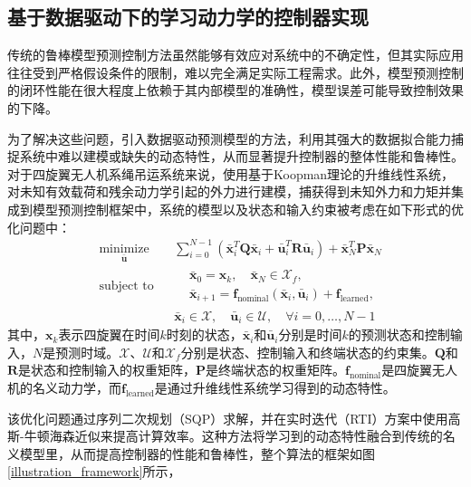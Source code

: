 \documentclass[lang=chs, degree=master, blindreview=false, winfonts=true]{yanputhesis}
\begin{document}
\subsection{基于数据驱动下的学习动力学的控制器实现}

传统的鲁棒模型预测控制方法虽然能够有效应对系统中的不确定性，但其实际应用往往受到严格假设条件的限制，难以完全满足实际工程需求。此外，模型预测控制的闭环性能在很大程度上依赖于其内部模型的准确性，模型误差可能导致控制效果的下降。

为了解决这些问题，引入数据驱动预测模型的方法，利用其强大的数据拟合能力捕捉系统中难以建模或缺失的动态特性，从而显著提升控制器的整体性能和鲁棒性。
对于四旋翼无人机系绳吊运系统来说，使用基于Koopman理论的升维线性系统，对未知有效载荷和残余动力学引起的外力进行建模，捕获得到未知外力和力矩并集成到模型预测控制框架中，系统的模型以及状态和输入约束被考虑在如下形式的优化问题中：
\begin{equation}
	\begin{aligned} \label{nmpc}
		&\operatorname*{minimize}_{\bm{\bar{u}}}& & \sum_{i=0}^{N-1}\left(\bm{\bar{x}}_i^T\bm{Q}\bm{\bar{x}}_i + \bm{\bar{u}}_i^T\bm{R}\bm{\bar{u}}_i\right) + \bm{\bar{x}}_N^T\bm{P}\bm{\bar{x}}_N  \\
		&\text{subject to}& & \begin{aligned}
			&\bm{\bar{x}}_{0} = \bm{x}_k, \quad \bm{\bar{x}}_{N} \in \mathcal{X}_f, \\
			&\bm{\bar{x}}_{i+1} = \bm{f}_{\text{nominal}}(\bm{\bar{x}}_i, \bm{\bar{u}}_i) + \bm{f}_{\text{learned}},
		\end{aligned} \\
		&&& \bm{\bar{x}}_i \in \mathcal{X}, \quad \bm{\bar{u}}_i \in \mathcal{U}, \quad \forall i = 0, \ldots, N-1
	\end{aligned}
\end{equation}
其中，$\bm{x}_k$表示四旋翼在时间$k$时刻的状态，$\bm{\bar{x}}_i$和$\bm{\bar{u}}_i$分别是时间$k$的预测状态和控制输入，$N$是预测时域。$\mathcal{X}$、$\mathcal{U}$和$\mathcal{X}_f$分别是状态、控制输入和终端状态的约束集。$\bm{Q}$和$\bm{R}$是状态和控制输入的权重矩阵，$\bm{P}$是终端状态的权重矩阵。$\bm{f}_{\text{nominal}}$是四旋翼无人机的名义动力学，而$\bm{f}_{\text{learned}}$是通过升维线性系统学习得到的动态特性。

该优化问题通过序列二次规划（SQP）求解，并在实时迭代（RTI）方案中使用高斯-牛顿海森近似来提高计算效率。这种方法将学习到的动态特性融合到传统的名义模型里，从而提高控制器的性能和鲁棒性，整个算法的框架如图\ref{illustration_framework}所示，
\end{document}
